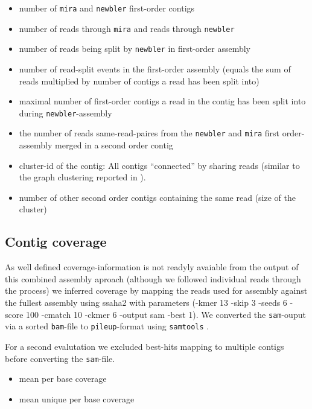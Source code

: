\begin{itemize}
\item number of \texttt{mira} and \texttt{newbler} first-order contigs
\item number of reads through \texttt{mira} and reads through \texttt{newbler}
\item number of reads being split by \texttt{newbler} in first-order
  assembly 
\item number of read-split events in the first-order assembly (equals
  the sum of reads multiplied by number of contigs a read has been
  split into)
\item maximal number of first-order contigs a read in the contig has
  been split into during \texttt{newbler}-assembly 
\item the number of reads same-read-paires from the \texttt{newbler}
  and \texttt{mira} first order-assembly merged in a second order
  contig
\item cluster-id of the contig: All contigs ``connected'' by sharing
  reads (similar to the graph clustering reported in
  \cite{pmid21138572}). 
\item number of other second order contigs containing the same read
  (size of the cluster)
\end{itemize}


\subsection{Contig coverage}

As well defined coverage-information is not readyly avaiable from the
output of this combined assembly aproach (although we followed
individual reads through the process) we inferred coverage by mapping
the reads used for assembly against the fullest assembly using ssaha2
\cite{pmid11591649} with parameters (-kmer 13 -skip 3 -seeds 6 -score
100 -cmatch 10 -ckmer 6 -output sam -best 1). We converted the
\texttt{sam}-ouput via a sorted \texttt{bam}-file to
\texttt{pileup}-format using \texttt{samtools}
\cite{journals/bioinformatics/LiHWFRHMAD09}.

For a second evalutation we excluded best-hits mapping to multiple
contigs before converting the \texttt{sam}-file. 
\begin{itemize}
\item mean per base coverage
\item mean unique per base coverage

\end{itemize}

